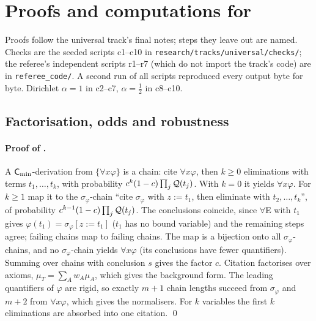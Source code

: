 
\section{Proofs and computations for \texorpdfstring{}{Section 3}}\label{app:univ}

Proofs follow the universal track's final notes; steps they leave out are named. Checks are the seeded scripts c1--c10 in \texttt{research/tracks/universal/checks/}; the referee's independent scripts r1--r7 (which do not import the track's code) are in \texttt{referee\_code/}. A second run of all scripts reproduced every output byte for byte. Dirichlet $\alpha=1$ in c2--c7, $\alpha=\tfrac12$ in c8--c10.

\subsection{Factorisation, odds and robustness}\label{app:univ:odds}

\paragraph{Proof of .} A $\mathsf{C}_{\min}$-derivation from $\{\forall x\varphi\}$ is a chain: cite $\forall x\varphi$, then $k\ge0$ eliminations with terms $t_1,\dots,t_k$, with probability $c^k(1-c)\prod_j\mathcal{Q}(t_j)$. With $k=0$ it yields $\forall x\varphi$. For $k\ge1$ map it to the $\sigma_\varphi$-chain ``cite $\sigma_\varphi$ with $z:=t_1$, then eliminate with $t_2,\dots,t_k$'', of probability $c^{k-1}(1-c)\prod_j\mathcal{Q}(t_j)$. The conclusions coincide, since $\forall$E with $t_1$ gives $\varphi(t_1)=\sigma_\varphi[z:=t_1]$ ($t_1$ has no bound variable) and the remaining steps agree; failing chains map to failing chains. The map is a bijection onto all $\sigma_\varphi$-chains, and no $\sigma_\varphi$-chain yields $\forall x\varphi$ (its conclusions have fewer quantifiers). Summing over chains with conclusion $s$ gives the factor $c$. Citation factorises over axioms, $\mu_T=\sum_Aw_A\mu_A$, which gives the background form. The leading quantifiers of $\varphi$ are rigid, so exactly $m+1$ chain lengths succeed from $\sigma_\varphi$ and $m+2$ from $\forall x\varphi$, which gives the normalisers. For $k$ variables the first $k$ eliminations are absorbed into one citation. \qed

